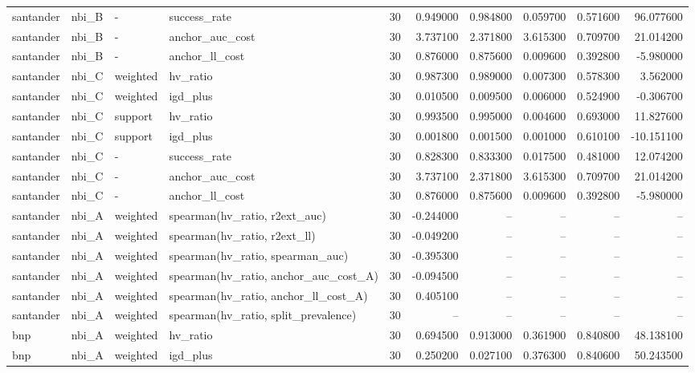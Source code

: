 \begin{landscape}
\begin{longtable}{llllrrrrrr}
santander & nbi\_B & - & success\_rate & 30 & 0.949000 & 0.984800 & 0.059700 & 0.571600 & 96.077600 \\
santander & nbi\_B & - & anchor\_auc\_cost & 30 & 3.737100 & 2.371800 & 3.615300 & 0.709700 & 21.014200 \\
santander & nbi\_B & - & anchor\_ll\_cost & 30 & 0.876000 & 0.875600 & 0.009600 & 0.392800 & -5.980000 \\
santander & nbi\_C & weighted & hv\_ratio & 30 & 0.987300 & 0.989000 & 0.007300 & 0.578300 & 3.562000 \\
santander & nbi\_C & weighted & igd\_plus & 30 & 0.010500 & 0.009500 & 0.006000 & 0.524900 & -0.306700 \\
santander & nbi\_C & support & hv\_ratio & 30 & 0.993500 & 0.995000 & 0.004600 & 0.693000 & 11.827600 \\
santander & nbi\_C & support & igd\_plus & 30 & 0.001800 & 0.001500 & 0.001000 & 0.610100 & -10.151100 \\
santander & nbi\_C & - & success\_rate & 30 & 0.828300 & 0.833300 & 0.017500 & 0.481000 & 12.074200 \\
santander & nbi\_C & - & anchor\_auc\_cost & 30 & 3.737100 & 2.371800 & 3.615300 & 0.709700 & 21.014200 \\
santander & nbi\_C & - & anchor\_ll\_cost & 30 & 0.876000 & 0.875600 & 0.009600 & 0.392800 & -5.980000 \\
santander & nbi\_A & weighted & spearman(hv\_ratio, r2ext\_auc) & 30 & -0.244000 & -- & -- & -- & -- \\
santander & nbi\_A & weighted & spearman(hv\_ratio, r2ext\_ll) & 30 & -0.049200 & -- & -- & -- & -- \\
santander & nbi\_A & weighted & spearman(hv\_ratio, spearman\_auc) & 30 & -0.395300 & -- & -- & -- & -- \\
santander & nbi\_A & weighted & spearman(hv\_ratio, anchor\_auc\_cost\_A) & 30 & -0.094500 & -- & -- & -- & -- \\
santander & nbi\_A & weighted & spearman(hv\_ratio, anchor\_ll\_cost\_A) & 30 & 0.405100 & -- & -- & -- & -- \\
santander & nbi\_A & weighted & spearman(hv\_ratio, split\_prevalence) & 30 & -- & -- & -- & -- & -- \\
bnp & nbi\_A & weighted & hv\_ratio & 30 & 0.694500 & 0.913000 & 0.361900 & 0.840800 & 48.138100 \\
bnp & nbi\_A & weighted & igd\_plus & 30 & 0.250200 & 0.027100 & 0.376300 & 0.840600 & 50.243500 \\

\end{longtable}
\end{landscape}
